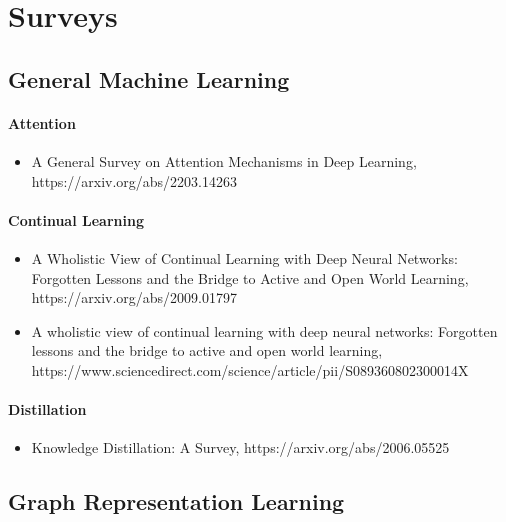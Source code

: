 \section{Surveys}

\subsection{General Machine Learning}

\paragraph{Attention}

\begin{itemize}
\item A General Survey on Attention Mechanisms in Deep Learning, https://arxiv.org/abs/2203.14263
\end{itemize}

\paragraph{Continual Learning}

\begin{itemize}
\item A Wholistic View of Continual Learning with Deep Neural Networks: Forgotten Lessons and the Bridge to Active and Open World Learning, https://arxiv.org/abs/2009.01797

\item A wholistic view of continual learning with deep neural networks: Forgotten lessons and the bridge to active and open world learning, https://www.sciencedirect.com/science/article/pii/S089360802300014X
\end{itemize}

\paragraph{Distillation}

\begin{itemize}
\item Knowledge Distillation: A Survey, https://arxiv.org/abs/2006.05525
\end{itemize}

\subsection{Graph Representation Learning}

